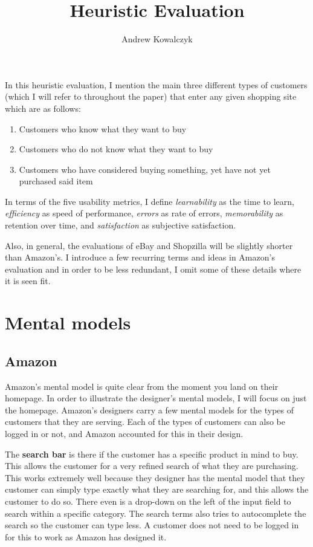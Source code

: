 \documentclass[11pt, oneside]{article}
\title{Heuristic Evaluation}
\author{Andrew Kowalczyk}
\begin{document}
\maketitle

In this heuristic evaluation, I mention the main three different types of customers (which I will refer to throughout the paper) that enter any given shopping site which are as follows:
\begin{enumerate}
\item Customers who know what they want to buy 
\item Customers who do not know what they want to buy
\item Customers who have considered buying something, yet have not yet purchased said item
\end{enumerate}

In terms of the five usability metrics, I define \textit{learnability} as the time to learn, \textit{efficiency} as speed of performance, \textit{errors} as rate of errors, \textit{memorability} as retention over time, and \textit{satisfaction} as subjective satisfaction.

Also, in general, the evaluations of eBay and Shopzilla will be slightly shorter than Amazon's. I introduce a few recurring terms and ideas in Amazon's evaluation and in order to be less redundant, I omit some of these details where it is seen fit.

\section{Mental models}

	\subsection{Amazon}

	Amazon's mental model is quite clear from the moment you land on their homepage. In order to illustrate the designer's mental models, I will focus on just the homepage. Amazon's designers carry a few mental models for the types of customers that they are serving. Each of the types of customers can also be logged in or not, and Amazon accounted for this in their design.

	The \textbf{search bar} is there if the customer has a specific product in mind to buy. This allows the customer for a very refined search of what they are purchasing. This works extremely well because they designer has the mental model that they customer can simply type exactly what they are searching for, and this allows the customer to do so. There even is a drop-down on the left of the input field to search within a specific category. The search terms also tries to autocomplete the search so the customer can type less. A customer does not need to be logged in for this to work as Amazon has designed it.
\end{document}
